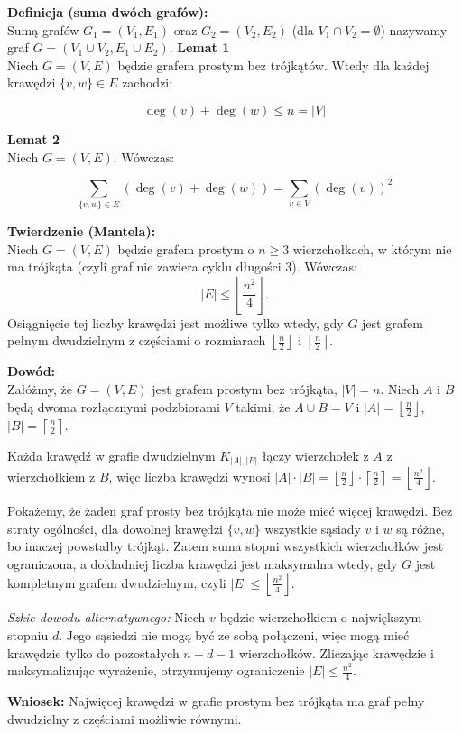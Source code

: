 \documentclass{article}
\begin{document}
\textbf{Definicja (suma dwóch grafów):}\\
Sumą grafów $G_1 = (V_1, E_1)$ oraz $G_2 = (V_2, E_2)$ (dla $V_1 \cap V_2 = \emptyset$) nazywamy graf $G = (V_1 \cup V_2, E_1 \cup E_2)$.
\newline
\textbf{Lemat 1}\\
Niech $G = (V, E)$ będzie grafem prostym bez trójkątów. Wtedy dla każdej krawędzi $\{v, w\} \in E$ zachodzi:
\begin{center}
    \[
    \deg(v) + \deg(w) \leq n = |V|
    \]
\end{center}

\vspace{1em}

\textbf{Lemat 2}\\
Niech $G = (V, E)$. Wówczas:
\begin{center}
    \[
    \sum_{\{v, w\} \in E} \left( \deg(v) + \deg(w) \right) = \sum_{v \in V} \left(\deg(v)\right)^2
    \]
\end{center}

\textbf{Twierdzenie (Mantela):}\\
Niech $G = (V, E)$ będzie grafem prostym o $n \geq 3$ wierzchołkach, w którym nie ma trójkąta (czyli graf nie zawiera cyklu długości 3). Wówczas:
\[
|E| \leq \left\lfloor \frac{n^2}{4} \right\rfloor.
\]
Osiągnięcie tej liczby krawędzi jest możliwe tylko wtedy, gdy $G$ jest grafem pełnym dwudzielnym z częściami o rozmiarach $\left\lfloor \frac{n}{2} \right\rfloor$ i $\left\lceil \frac{n}{2} \right\rceil$.

\vspace{1em}

\textbf{Dowód:}\\
Załóżmy, że $G = (V, E)$ jest grafem prostym bez trójkąta, $|V| = n$. Niech $A$ i $B$ będą dwoma rozłącznymi podzbiorami $V$ takimi, że $A \cup B = V$ i $|A| = \left\lfloor \frac{n}{2} \right\rfloor$, $|B| = \left\lceil \frac{n}{2} \right\rceil$. 

Każda krawędź w grafie dwudzielnym $K_{|A|, |B|}$ łączy wierzchołek z $A$ z wierzchołkiem z $B$, więc liczba krawędzi wynosi $|A| \cdot |B| = \left\lfloor \frac{n}{2} \right\rfloor \cdot \left\lceil \frac{n}{2} \right\rceil = \left\lfloor \frac{n^2}{4} \right\rfloor$. 

Pokażemy, że żaden graf prosty bez trójkąta nie może mieć więcej krawędzi. Bez straty ogólności, dla dowolnej krawędzi $\{v, w\}$ wszystkie sąsiady $v$ i $w$ są różne, bo inaczej powstałby trójkąt. Zatem suma stopni wszystkich wierzchołków jest ograniczona, a dokładniej liczba krawędzi jest maksymalna wtedy, gdy $G$ jest kompletnym grafem dwudzielnym, czyli $|E| \leq \left\lfloor \frac{n^2}{4} \right\rfloor$. 

\vspace{0.5em}
\textit{Szkic dowodu alternatywnego:} Niech $v$ będzie wierzchołkiem o największym stopniu $d$. Jego sąsiedzi nie mogą być ze sobą połączeni, więc mogą mieć krawędzie tylko do pozostałych $n-d-1$ wierzchołków. Zliczając krawędzie i maksymalizując wyrażenie, otrzymujemy ograniczenie $|E| \leq \frac{n^2}{4}$. 

\textbf{Wniosek:} Najwięcej krawędzi w grafie prostym bez trójkąta ma graf pełny dwudzielny z częściami możliwie równymi.
\end{document}
